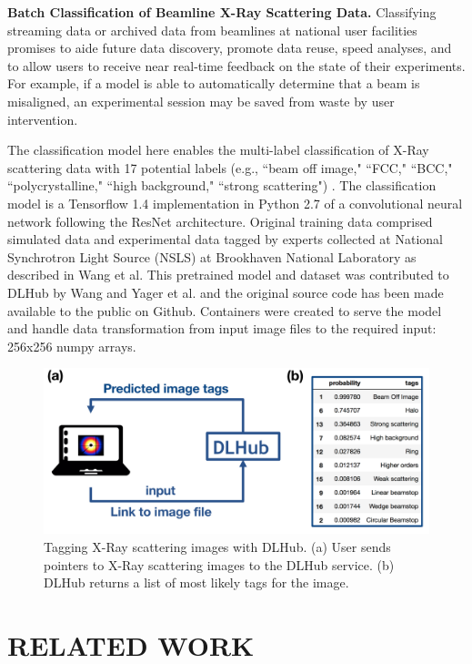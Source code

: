 \documentclass{aip-cp}
\begin{document}
\textbf{Batch Classification of Beamline X-Ray Scattering Data.}
Classifying streaming data or archived data from beamlines at national user
facilities promises to aide future data discovery, promote data reuse, speed
analyses, and to allow users to receive near real-time feedback on the state
of their experiments. For example, if a model is able to automatically
determine that a beam is misaligned, an experimental session may be saved from
waste by user intervention.

The classification model here enables the multi-label classification of X-Ray
scattering data with 17 potential labels (e.g., ``beam off image," ``FCC,"
``BCC," ``polycrystalline," ``high background," ``strong scattering") \cite{wang2017x}. The
classification model is a Tensorflow 1.4 implementation in Python 2.7 of a
convolutional neural network following the ResNet architecture. Original
training data comprised simulated data and experimental data tagged by experts
collected at National Synchrotron Light Source (NSLS) at Brookhaven National
Laboratory as described in Wang et al. This pretrained model and dataset was
contributed to DLHub by Wang and Yager et al. and the original source code has
been made available to the public on Github\cite{wang2017xcode}. Containers were created to serve
the model and handle data transformation from input image files to the
required input: 256x256 numpy arrays.

\begin{figure}[h]
  \centerline{\includegraphics[width=5in]{Figs/DLHub-BNL.png}}
  \caption{Tagging X-Ray scattering images with DLHub. (a) User sends pointers to X-Ray scattering images to the DLHub service. (b) DLHub returns a list of most likely tags for the image.
\label{fig:dlhub-bnl}}
\end{figure}

\section{RELATED WORK}
\end{document}
